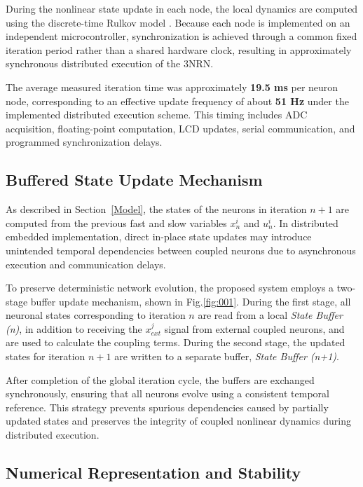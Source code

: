 \documentclass[lettersize,journal]{IEEEtran}
\begin{document}
During the nonlinear state update in each node, the local dynamics are computed using the discrete-time Rulkov model \cite{rulkov2002modeling}. Because each node is implemented on an independent microcontroller, synchronization is achieved through a common fixed iteration period rather than a shared hardware clock, resulting in approximately synchronous distributed execution of the 3NRN.

The average measured iteration time was approximately\textbf{ 19.5 ms} per neuron node, corresponding to an effective update frequency of about\textbf{ 51 Hz} under the implemented distributed execution scheme. This timing includes ADC acquisition, floating-point computation, LCD updates, serial communication, and programmed synchronization delays.

\subsection{Buffered State Update Mechanism}

As described in Section~\ref{Model}, the states of the neurons in iteration $n+1$ are computed from the previous fast and slow variables $x_n^i$ and $u_n^i$. In distributed embedded implementation, direct in-place state updates may introduce unintended temporal dependencies between coupled neurons due to asynchronous execution and communication delays.

To preserve deterministic network evolution, the proposed system employs a two-stage buffer update mechanism, shown in Fig.\ref{fig:001}. During the first stage, all neuronal states corresponding to iteration $n$ are read from a local \textit{State Buffer (n)}, in addition to receiving the $ x_{ext}^j$ signal from external coupled neurons, and are used to calculate the coupling terms. During the second stage, the updated states for iteration $n+1$ are written to a separate buffer, \textit{State Buffer (n+1)}.

After completion of the global iteration cycle, the buffers are exchanged synchronously, ensuring that all neurons evolve using a consistent temporal reference. This strategy prevents spurious dependencies caused by partially updated states and preserves the integrity of coupled nonlinear dynamics during distributed execution.

\subsection{Numerical Representation and Stability} \label{Numerical}
\end{document}
